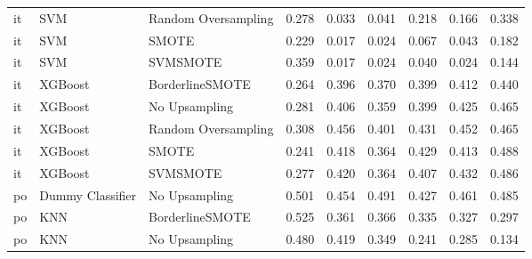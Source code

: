 \begin{tabular}{lllllllll}
      it &                          SVM & Random Oversampling & 0.278 &                     0.033 &                 0.041 &                  0.218 &                                   0.166 &     0.338 \\
      it &                          SVM &               SMOTE & 0.229 &                     0.017 &                 0.024 &                  0.067 &                                   0.043 &     0.182 \\
      it &                          SVM &            SVMSMOTE & 0.359 &                     0.017 &                 0.024 &                  0.040 &                                   0.024 &     0.144 \\
      it &                      XGBoost &     BorderlineSMOTE & 0.264 &                     0.396 &                 0.370 &                  0.399 &                                   0.412 &     0.440 \\
      it &                      XGBoost &       No Upsampling & 0.281 &                     0.406 &                 0.359 &                  0.399 &                                   0.425 &     0.465 \\
      it &                      XGBoost & Random Oversampling & 0.308 &                     0.456 &                 0.401 &                  0.431 &                                   0.452 &     0.465 \\
      it &                      XGBoost &               SMOTE & 0.241 &                     0.418 &                 0.364 &                  0.429 &                                   0.413 &     0.488 \\
      it &                      XGBoost &            SVMSMOTE & 0.277 &                     0.420 &                 0.364 &                  0.407 &                                   0.432 &     0.486 \\
      po &             Dummy Classifier &       No Upsampling & 0.501 &                     0.454 &                 0.491 &                  0.427 &                                   0.461 &     0.485 \\
      po &                          KNN &     BorderlineSMOTE & 0.525 &                     0.361 &                 0.366 &                  0.335 &                                   0.327 &     0.297 \\
      po &                          KNN &       No Upsampling & 0.480 &                     0.419 &                 0.349 &                  0.241 &                                   0.285 &     0.134 \\

\end{tabular}
